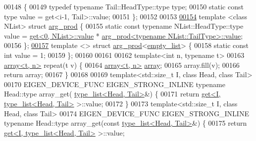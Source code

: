\begin{DoxyCode}
00148 \{
00149   \textcolor{keyword}{typedef} \textcolor{keyword}{typename} Tail::HeadType::type type;
00150   \textcolor{keyword}{static} \textcolor{keyword}{const} type value = \textcolor{keyword}{get}<i-1, Tail>::value;
00151 \};
00152 
00153 
\hyperlink{struct_eigen_1_1internal_1_1arg__prod}{00154} \textcolor{keyword}{template} <\textcolor{keyword}{class} NList> \textcolor{keyword}{struct }\hyperlink{struct_eigen_1_1internal_1_1arg__prod}{arg\_prod} \{
00155   \textcolor{keyword}{static} \textcolor{keyword}{const} \textcolor{keyword}{typename} NList::HeadType::type value = \hyperlink{struct_eigen_1_1internal_1_1get}{get<0, NList>::value} * 
      \hyperlink{struct_eigen_1_1internal_1_1arg__prod}{arg\_prod<typename NList::TailType>::value};
00156 \};
\hyperlink{struct_eigen_1_1internal_1_1arg__prod_3_01empty__list_01_4}{00157} \textcolor{keyword}{template} <> \textcolor{keyword}{struct }\hyperlink{struct_eigen_1_1internal_1_1arg__prod}{arg\_prod}<\hyperlink{struct_eigen_1_1internal_1_1empty__list}{empty\_list}> \{
00158   \textcolor{keyword}{static} \textcolor{keyword}{const} \textcolor{keywordtype}{int} value = 1;
00159 \};
00160 
00161 
00162 \textcolor{keyword}{template}<\textcolor{keywordtype}{int} n, \textcolor{keyword}{typename} t>
00163 \hyperlink{class_eigen_1_1array}{array<t, n>} repeat(t v) \{
00164   \hyperlink{class_eigen_1_1array}{array<t, n>} \hyperlink{class_eigen_1_1array}{array};
00165   array.fill(v);
00166   \textcolor{keywordflow}{return} array;
00167 \}
00168 
00169 \textcolor{keyword}{template}<std::\textcolor{keywordtype}{size\_t} I, \textcolor{keyword}{class} Head, \textcolor{keyword}{class} Tail>
00170 EIGEN\_DEVICE\_FUNC EIGEN\_STRONG\_INLINE \textcolor{keyword}{typename} Head::type array\_get(
      \hyperlink{struct_eigen_1_1internal_1_1type__list}{type\_list<Head, Tail>}&) \{
00171   \textcolor{keywordflow}{return} \hyperlink{struct_eigen_1_1internal_1_1get}{get<I, type\_list<Head, Tail>} >::value;
00172 \}
00173 \textcolor{keyword}{template}<std::\textcolor{keywordtype}{size\_t} I, \textcolor{keyword}{class} Head, \textcolor{keyword}{class} Tail>
00174 EIGEN\_DEVICE\_FUNC EIGEN\_STRONG\_INLINE \textcolor{keyword}{typename} Head::type array\_get(\textcolor{keyword}{const} 
      \hyperlink{struct_eigen_1_1internal_1_1type__list}{type\_list<Head, Tail>}&) \{
00175   \textcolor{keywordflow}{return} \hyperlink{struct_eigen_1_1internal_1_1get}{get<I, type\_list<Head, Tail>} >::value;

\end{DoxyCode}
